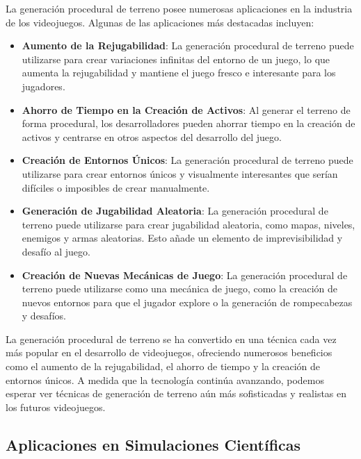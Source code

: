 La generación procedural de terreno posee numerosas aplicaciones en la industria de los videojuegos. Algunas de las aplicaciones más destacadas incluyen:

\begin{itemize}
    \item \textbf{Aumento de la Rejugabilidad}: La generación procedural de terreno puede utilizarse para crear variaciones infinitas del entorno de un juego, lo que aumenta la rejugabilidad y mantiene el juego fresco e interesante para los jugadores\cite{Rejugabilidad}.

    \item \textbf{Ahorro de Tiempo en la Creación de Activos}: Al generar el terreno de forma procedural, los desarrolladores pueden ahorrar tiempo en la creación de activos y centrarse en otros aspectos del desarrollo del juego\cite{AhorroTiempo}.

    \item \textbf{Creación de Entornos Únicos}: La generación procedural de terreno puede utilizarse para crear entornos únicos y visualmente interesantes que serían difíciles o imposibles de crear manualmente\cite{EntornosUnicos}.

    \item \textbf{Generación de Jugabilidad Aleatoria}: La generación procedural de terreno puede utilizarse para crear jugabilidad aleatoria, como mapas, niveles, enemigos y armas aleatorias. Esto añade un elemento de imprevisibilidad y desafío al juego\cite{JugabilidadAleatoria}.

    \item \textbf{Creación de Nuevas Mecánicas de Juego}: La generación procedural de terreno puede utilizarse como una mecánica de juego, como la creación de nuevos entornos para que el jugador explore o la generación de rompecabezas y desafíos\cite{NuevasMecanicas}.
\end{itemize} 

La generación procedural de terreno se ha convertido en una técnica cada vez más popular en el desarrollo de videojuegos, ofreciendo numerosos beneficios como el aumento de la rejugabilidad, el ahorro de tiempo y la creación de entornos únicos. A medida que la tecnología continúa avanzando, podemos esperar ver técnicas de generación de terreno aún más sofisticadas y realistas en los futuros videojuegos.

\subsection{Aplicaciones en Simulaciones Científicas}

